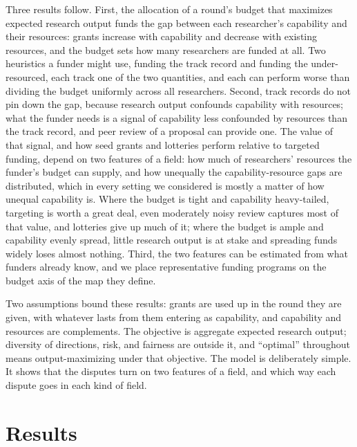 \documentclass[article, 11pt, reqno]{amsart}
\theoremstyle{named}
\begin{document}
Three results follow. First, the allocation of a round's budget that maximizes expected research output funds the gap between each researcher's capability and their resources: grants increase with capability and decrease with existing resources, and the budget sets how many researchers are funded at all. Two heuristics a funder might use, funding the track record and funding the under-resourced, each track one of the two quantities, and each can perform worse than dividing the budget uniformly across all researchers. Second, track records do not pin down the gap, because research output confounds capability with resources; what the funder needs is a signal of capability less confounded by resources than the track record, and peer review of a proposal can provide one. The value of that signal, and how seed grants and lotteries perform relative to targeted funding, depend on two features of a field: how much of researchers' resources the funder's budget can supply, and how unequally the capability-resource gaps are distributed, which in every setting we considered is mostly a matter of how unequal capability is. Where the budget is tight and capability heavy-tailed, targeting is worth a great deal, even moderately noisy review captures most of that value, and lotteries give up much of it; where the budget is ample and capability evenly spread, little research output is at stake and spreading funds widely loses almost nothing. Third, the two features can be estimated from what funders already know, and we place representative funding programs on the budget axis of the map they define.

Two assumptions bound these results: grants are used up in the round they are given, with whatever lasts from them entering as capability, and capability and resources are complements. The objective is aggregate expected research output; diversity of directions, risk, and fairness are outside it, and ``optimal'' throughout means output-maximizing under that objective. The model is deliberately simple. It shows that the disputes turn on two features of a field, and which way each dispute goes in each kind of field.

\section*{Results}
\end{document}
